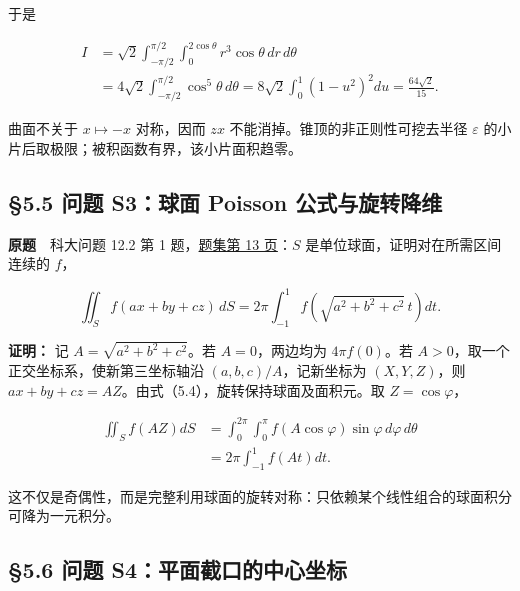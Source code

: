 \documentclass[11pt,a4paper]{article}
\begin{document}
于是

\begin{equation*}
\begin{aligned}
 I&=\sqrt2\int_{-\pi/2}^{\pi/2}\!\int_0^{2\cos\theta}
      r^3\cos\theta\,dr\,d\theta\\
 &=4\sqrt2\int_{-\pi/2}^{\pi/2}\cos^5\theta\,d\theta
 =8\sqrt2\int_0^1(1-u^2)^2du
 =\frac{64\sqrt2}{15}.
\end{aligned}
\end{equation*}

曲面不关于 \(x\mapsto-x\) 对称，因而 \(zx\)
不能消掉。锥顶的非正则性可挖去半径 \(\varepsilon\)
的小片后取极限；被积函数有界，该小片面积趋零。

\subsection{§5.5 问题 S3：球面 Poisson
公式与旋转降维}\label{ux95eeux9898-s3ux7403ux9762-poisson-ux516cux5f0fux4e0eux65cbux8f6cux964dux7ef4}

\textbf{原题}　科大问题 12.2 第 1
题，\href{https://zj139.github.io/math-notes/files/problems/科大数分习题-v2\%282\%29.pdf\#page=13}{题集第
13 页}：\(S\) 是单位球面，证明对在所需区间连续的 \(f\)，

\begin{equation*}
 \iint_Sf(ax+by+cz)\,dS
 =2\pi\int_{-1}^1f\!\left(\sqrt{a^2+b^2+c^2}\,t\right)dt.\tag{5.5}
\end{equation*}

\textbf{证明：} 记 \(A=\sqrt{a^2+b^2+c^2}\)。若 \(A=0\)，两边均为
\(4\pi f(0)\)。若 \(A>0\)，取一个正交坐标系，使新第三坐标轴沿
\((a,b,c)/A\)，记新坐标为 \((X,Y,Z)\)，则
\(ax+by+cz=AZ\)。由式（5.4），旋转保持球面及面积元。取
\(Z=\cos\varphi\)，

\begin{equation*}
\begin{aligned}
 \iint_Sf(AZ)dS
 &=\int_0^{2\pi}\!\int_0^\pi f(A\cos\varphi)\sin\varphi\,d\varphi\,d\theta\\
 &=2\pi\int_{-1}^1f(At)dt.
\end{aligned}
\end{equation*}

这不仅是奇偶性，而是完整利用球面的旋转对称：只依赖某个线性组合的球面积分可降为一元积分。

\subsection{§5.6 问题
S4：平面截口的中心坐标}\label{ux95eeux9898-s4ux5e73ux9762ux622aux53e3ux7684ux4e2dux5fc3ux5750ux6807}
\end{document}
